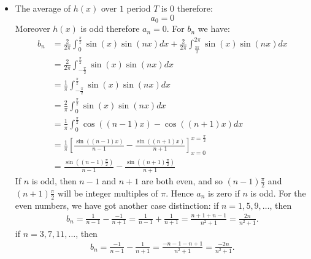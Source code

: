 \documentclass[11pt]{article}
\begin{document}
\begin{solution}
\begin{itemize}
    \item 
    The average of $h(x)$ over $1$ period $T$ is $0$ therefore:
    \[
        a_0 = 0
    \]
    Moreover $h(x)$ is odd therefore $a_n = 0$. For $b_n$ we have:
    \begin{align*}
        b_n 
        &
        = 
        \frac{2}{2\pi}
        \int_{0}^{\frac{\pi}{2}} \sin(x) \sin(n x) dx
        +
        \frac{2}{2\pi}
        \int_{\frac{3\pi}{2}}^{2\pi} \sin(x) \sin(n x) dx
        \\&
        =
        \frac{2}{2\pi}
        \int_{-\frac{\pi}{2}}^{\frac{\pi}{2}} \sin(x) \sin(n x) dx
        \\&
        =
        \frac{1}{\pi}
        \int_{-\frac{\pi}{2}}^{\frac{\pi}{2}} \sin(x) \sin(n x) dx
        \\&
        =
        \frac{2}{\pi}
        \int_{0}^{\frac{\pi}{2}} \sin(x) \sin(n x) dx
        \\&
        =
        \frac{1}{\pi}
        \int_{0}^{\frac{\pi}{2}} \cos((n-1)x) - \cos((n+1)x) dx
        \\&
        =
        \frac{1}{\pi}
        \left[ \frac{\sin((n-1)x)}{n-1} - \frac{\sin((n+1)x)}{n+1}\right]_{x=0}^{x=\frac{\pi}{2}}
        \\&
        =
        \frac{\sin((n-1)\frac{\pi}{2})}{n-1} - \frac{\sin((n+1)\frac{\pi}{2})}{n+1}
    \end{align*}
    If $n$ is odd, then $n-1$ and $n+1$ are both even, and so $(n-1)\frac{\pi}{2}$ and $(n+1)\frac{\pi}{2}$ will be integer multiples of $\pi$. 
    Hence $a_n$ is zero if $n$ is odd. 
    For the even numbers, we have got another case distinction:
    if $n=1,5,9,\dots$, then 
    \begin{align*}
        b_n = \frac{1}{n-1} - \frac{-1}{n+1} = \frac{1}{n-1} + \frac{1}{n+1} = \frac{n+1+n-1}{n^2+1} = \frac{2n}{n^2+1}.
    \end{align*}
    if $n=3,7,11,\dots$, then 
    \begin{align*}
        b_n = \frac{-1}{n-1} - \frac{1}{n+1} = \frac{-n-1-n+1}{n^2+1} = \frac{-2n}{n^2+1}.
    \end{align*}
    


\end{itemize}
\end{solution}
\end{document}
